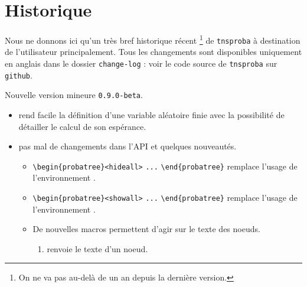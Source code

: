 \documentclass[12pt,a4paper]{article}
\begin{document}
\newpage

\section{Historique}

Nous ne donnons ici qu'un très bref historique récent
\footnote{
	On ne va pas au-delà de un an depuis la dernière version.
}
de \verb+tnsproba+ à destination de l'utilisateur principalement.
Tous les changements sont disponibles uniquement en anglais dans le dossier \verb+change-log+ : voir le code source de \verb+tnsproba+ sur \verb+github+.

\begin{description}

    \medskip
    \item[2020-09-02] Nouvelle version mineure \verb+0.9.0-beta+.
    
    \begin{itemize}[itemsep=.5em]
        \item {}
        	   rend facile la définition d'une variable aléatoire finie avec la possibilité de détailler le calcul de son espérance.
    
    
    
    
        \item {}
        	  pas mal de changements dans l'API et quelques nouveautés.
    
        \begin{itemize}[itemsep=.5em]
            \item \verb#\begin{probatree}<hideall># \verb#...# \verb#\end{probatree}#  remplace l'usage de l'environnement .
    
    
            \item \verb#\begin{probatree}<showall># \verb#...# \verb#\end{probatree}# remplace l'usage de l'environnement .
    
    
            \item De nouvelles macros permettent d'agir sur le texte des noeuds.
    
            \begin{enumerate}
            	\item {} renvoie le texte d'un noeud.
    

\end{enumerate}
\end{itemize}
\end{itemize}
\end{description}
\end{document}
